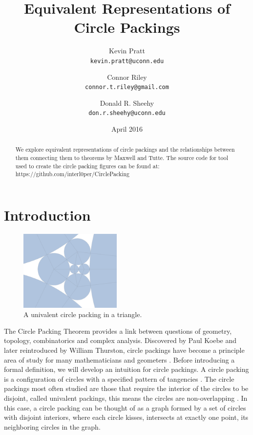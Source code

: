 \documentclass[11pt]{article}
\title{Equivalent Representations of Circle Packings}
\author{
  Kevin Pratt\\
  \texttt{kevin.pratt@uconn.edu}
  \and
  Connor Riley\\
  \texttt{connor.t.riley@gmail.com}
    \and
  Donald R. Sheehy\\
  \texttt{don.r.sheehy@uconn.edu}
}\date{April 2016}
\theoremstyle{definition}
\begin{document}
\maketitle

\begin{abstract}
  We explore equivalent representations of circle packings and the relationships between them connecting them to theorems by Maxwell and Tutte.  
  The source code for tool used to create the circle packing figures can be found at: https://github.com/interl0per/CirclePacking
\end{abstract}

\section{Introduction}

\begin{figure}
  \begin{center}
    \includegraphics[scale=.18,width=0.45\textwidth]{circlepacking_1}
  \end{center}
  \caption{A univalent circle packing in a triangle.}
\end{figure}

	The Circle Packing Theorem provides a link between questions of geometry, topology, combinatorics and complex analysis. 
	Discovered by Paul Koebe and later reintroduced by William Thurston, circle packings have become a principle area of study for many mathematicians and geometers \cite{wilkerson}. 
	Before introducing a formal definition, we will develop an intuition for circle packings. 
	A circle packing is a configuration of circles with a specified pattern of tangencies \cite{stephenson05introduction}. 
	The circle packings most often studied are those that require the interior of the circles to be disjoint, called univalent packings, this means the circles are non-overlapping \cite{stephenson05introduction}. 
	In this case, a circle packing can be thought of as a graph formed by a set of circles with disjoint interiors, where each circle kisses, intersects at exactly one point, its neighboring circles in the graph.
\end{document}
